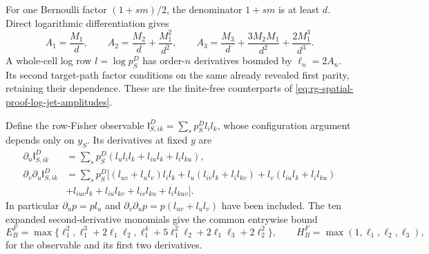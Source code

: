 For one Bernoulli factor \((1+s m)/2\), the denominator \(1+s m\) is
at least \(d\). Direct logarithmic differentiation gives
\begin{equation}
 A_1=\frac{M_1}{d},\qquad
 A_2=\frac{M_2}{d}+\frac{M_1^2}{d^2},\qquad
 A_3=\frac{M_3}{d}+\frac{3M_2M_1}{d^2}+\frac{2M_1^3}{d^3}.
 \label{eq:rg-thermo-native-log-amplitudes}
\end{equation}
A whole-cell log row \(l=\log p^D_S\) has order-\(n\) derivatives
bounded by \(\ell_n=2A_n\). Its second target-path factor conditions
on the same already revealed first parity, retaining their dependence.
These are the finite-free counterparts of
\cref{eq:rg-spatial-proof-log-jet-amplitudes}.

Define the row-Fisher observable
\(\mathsf I^D_{S,ik}=\sum_s p^D_S l_i l_k\), whose configuration
argument depends only on \(y_S\). Its derivatives at fixed \(y\) are
\begin{equation}
 \begin{split}
 \partial_u\mathsf I^D_{S,ik}
 &=\sum_s p^D_S(l_ul_il_k+l_{iu}l_k+l_il_{ku}),\\
 \partial_v\partial_u\mathsf I^D_{S,ik}
 &=\sum_s p^D_S\bigl[(l_{uv}+l_ul_v)l_il_k
 +l_u(l_{iv}l_k+l_il_{kv})+l_v(l_{iu}l_k+l_il_{ku})\\
 &+l_{iuv}l_k+l_{iu}l_{kv}+l_{iv}l_{ku}+l_il_{kuv}\bigr].
 \end{split}
 \label{eq:rg-thermo-native-row-fisher-jets}
\end{equation}
In particular \(\partial_u p=p l_u\) and
\(\partial_v\partial_u p=p(l_{uv}+l_ul_v)\) have been included.
The ten expanded second-derivative monomials give the common entrywise
bound
\begin{equation}
 E_B^F=\max\{\ell_1^2,\ell_1^3+2\ell_1\ell_2,
          \ell_1^4+5\ell_1^2\ell_2+2\ell_1\ell_3+2\ell_2^2\},
 \qquad H_B^F=\max(1,\ell_1,\ell_2,\ell_3),
 \label{eq:rg-thermo-native-row-fisher-bound}
\end{equation}
for the observable and its first two derivatives.

